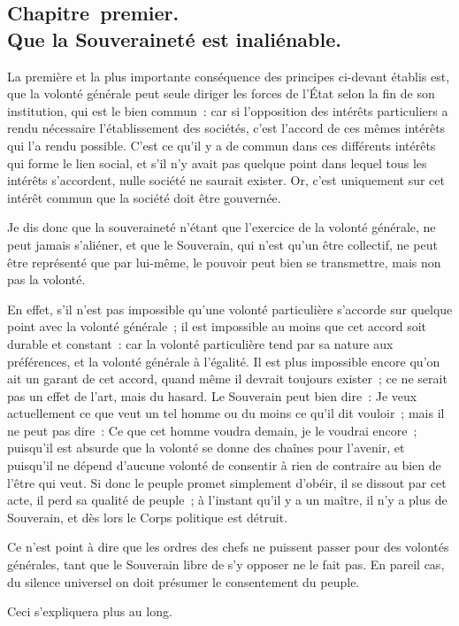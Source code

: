 \documentclass[french,twoside]{book} %
\begin{document}
\subsection[{Chapitre premier. Que la Souveraineté est inaliénable.}]{Chapitre premier. \\
Que la Souveraineté est inaliénable.}
\noindent La première et la plus importante conséquence des principes ci-devant établis est, que la volonté générale peut seule diriger les forces de l’État selon la fin de son institution, qui est le bien commun : car si l’opposition des intérêts particuliers a rendu nécessaire l’établissement des sociétés, c’est l’accord de ces mêmes intérêts qui l’a rendu possible. C’est ce qu’il y a de commun dans ces différents intérêts qui forme le lien social, et s’il n’y avait pas quelque point dans lequel tous les intérêts s’accordent, nulle société ne saurait exister. Or, c’est uniquement sur cet intérêt commun que la société doit être gouvernée.\par
Je dis donc que la souveraineté n’étant que l’exercice de la volonté générale, ne peut jamais s’aliéner, et que le Souverain, qui n’est qu’un être collectif, ne peut être représenté que par lui-même, le pouvoir peut bien se transmettre, mais non pas la volonté.\par
En effet, s’il n’est pas impossible qu’une volonté particulière s’accorde sur quelque point avec la volonté générale ; il est impossible au moins que cet accord soit durable et constant : car la volonté particulière tend par sa nature aux préférences, et la volonté générale à l’égalité. Il est plus impossible encore qu’on ait un garant de cet accord, quand même il devrait toujours exister ; ce ne serait pas un effet de l’art, mais du hasard. Le Souverain peut bien dire : Je veux actuellement ce que veut un tel homme ou du moins ce qu’il dit vouloir ; mais il ne peut pas dire : Ce que cet homme voudra demain, je le voudrai encore ; puisqu’il est absurde que la volonté se donne des chaînes pour l’avenir, et puisqu’il ne dépend d’aucune volonté de consentir à rien de contraire au bien de l’être qui veut. Si donc le peuple promet simplement d’obéir, il se dissout par cet acte, il perd sa qualité de peuple ; à l’instant qu’il y a un maître, il n’y a plus de Souverain, et dès lors le Corps politique est détruit.\par
Ce n’est point à dire que les ordres des chefs ne puissent passer pour des volontés générales, tant que le Souverain libre de s’y opposer ne le fait pas. En pareil cas, du silence universel on doit présumer le consentement du peuple.\par
Ceci s’expliquera plus au long.
\end{document}
